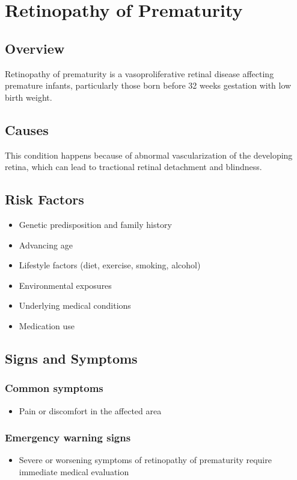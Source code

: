 \chapter{Retinopathy of Prematurity}
\label{sec:Retinopathy of Prematurity}

\section{Overview}
Retinopathy of prematurity is a vasoproliferative retinal disease affecting premature infants, particularly those born before 32 weeks gestation with low birth weight.
\section{Causes}
This condition happens because of abnormal vascularization of the developing retina, which can lead to tractional retinal detachment and blindness.     
\section{Risk Factors}

\begin{itemize}[noitemsep]
  \item Genetic predisposition and family history
  \item Advancing age
  \item Lifestyle factors (diet, exercise, smoking, alcohol)
  \item Environmental exposures
  \item Underlying medical conditions
  \item Medication use
\end{itemize}
\section{Signs and Symptoms}

\subsection{Common symptoms}
\begin{itemize}[noitemsep]
  \item Pain or discomfort in the affected area
  \end{itemize}

\subsection{Emergency warning signs}
\begin{itemize}[noitemsep]
  \item Severe or worsening symptoms of retinopathy of prematurity require immediate medical evaluation
\end{itemize}
